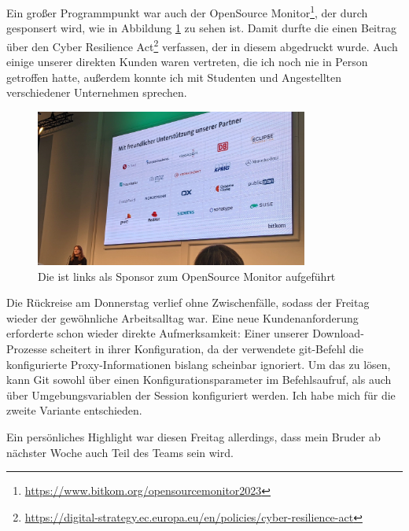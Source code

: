 Ein großer Programmpunkt war auch der {\bitkom} OpenSource Monitor\footnote{\url{https://www.bitkom.org/opensourcemonitor2023}}, der durch {\metaeffekt} gesponsert wird, wie in Abbildung \ref{fig:foss23-sponsor-metaeffekt} zu sehen ist.
Damit durfte die {\metaeffekt} einen Beitrag über den Cyber Resilience Act\footnote{\url{https://digital-strategy.ec.europa.eu/en/policies/cyber-resilience-act}} verfassen, der in diesem abgedruckt wurde.
Auch einige unserer direkten Kunden waren vertreten, die ich noch nie in Person getroffen hatte, außerdem konnte ich mit Studenten und Angestellten verschiedener Unternehmen sprechen.

\begin{figure}[htbp] %
    \centering
    \includegraphics[width=0.8\textwidth, keepaspectratio]{res/img/2023-10-19-ak-os-metaeffekt-sponsor}
    \caption{Die {\metaeffekt} ist links als Sponsor zum OpenSource Monitor aufgeführt}
    \label{fig:foss23-sponsor-metaeffekt}
\end{figure}

\sweekdaymarginpar{\weekdayThursdayShort, \weekdayFridayShort}

Die Rückreise am Donnerstag verlief ohne Zwischenfälle, sodass der Freitag wieder der gewöhnliche Arbeitsalltag war.
Eine neue Kundenanforderung erforderte schon wieder direkte Aufmerksamkeit:
Einer unserer Download-Prozesse scheitert in ihrer Konfiguration, da der verwendete git-Befehl die konfigurierte Proxy-Informationen bislang scheinbar ignoriert.
Um das zu lösen, kann Git sowohl über einen Konfigurationsparameter im Befehlsaufruf, als auch über Umgebungsvariablen der Session konfiguriert werden.
Ich habe mich für die zweite Variante entschieden.

Ein persönliches Highlight war diesen Freitag allerdings, dass mein Bruder ab nächster Woche auch Teil des {\metaeffekt} Teams sein wird.
